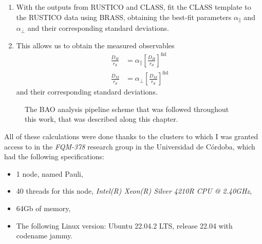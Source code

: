 \begin{enumerate}
\item With the outputs from RUSTICO and CLASS, fit the CLASS template to the RUSTICO data using BRASS, obtaining the best-fit parameters $\alpha_\parallel$ and $\alpha_\perp$ and their corresponding standard deviations.
\item This allows us to obtain the measured observables 
\begin{align}
	\frac{D_H}{r_d} &= \alpha_\parallel \left[ \frac{D_H}{r_d} \right]^\text{fid} \\
	\frac{D_M}{r_d} &= \alpha_\perp \left[ \frac{D_M}{r_d} \right]^\text{fid} 
\end{align}
and their corresponding standard deviations.

\end{enumerate}



\begin{figure}[b]
    \centering
    \caption[The BAO analysis pipeline.]{The BAO analysis pipeline scheme that was  followed throughout this work, that was described along this chapter. }
    \label{fig:pipeline}
\end{figure}
All of these calculations were done thanks to the clusters to which I was granted access to in the \textit{FQM-378} research group in the Universidad de Córdoba, which had the following specifications: 
\begin{itemize}
	\item 1 node, named Pauli,
\item 40 threads for this node, \textit{Intel(R) Xeon(R) Silver 4210R CPU @ 2.40GHz},
\item 64Gb of memory,
\item The following Linux version: Ubuntu 22.04.2 LTS, release 22.04 with codename jammy.
\end{itemize}
